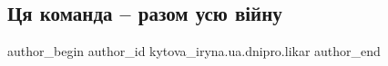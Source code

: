  
 
 
 
 

\subsection{Ця команда – разом усю війну}
\label{sec:12_01_2023.fb.kytova_iryna.ua.dnipro.likar.2.tsya_komanda___razom}

\ifcmt
 author_begin
   author_id kytova_iryna.ua.dnipro.likar
 author_end
\fi

